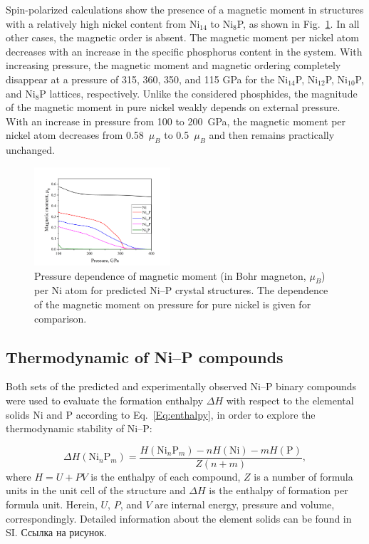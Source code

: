 \documentclass[twoside,twocolumn,9pt]{article}
\begin{document}
Spin-polarized calculations show the presence of a magnetic moment in structures with a relatively high nickel content from Ni$_{14}$ to Ni$_8$P, as shown in Fig.~\ref{fgr:magmom}. 
In all other cases, the magnetic order is absent. The magnetic moment per nickel atom decreases with an increase in the specific phosphorus content in the system. 
With increasing pressure, the magnetic moment and magnetic ordering completely disappear at a pressure of 315, 360, 350, and 115 GPa for the Ni$_{14}$P, Ni$_{12}$P, Ni$_{10}$P, and Ni$_8$P lattices, respectively. 
Unlike the considered phosphides, the magnitude of the magnetic moment in pure nickel weakly depends on external pressure. 
With an increase in pressure from 100 to 200~GPa, the magnetic moment per nickel atom decreases from 0.58~$\mu_B$ to 0.5~$\mu_B$ and then remains practically unchanged.

\begin{figure}[h]
\centering
  \includegraphics[width=0.45\textwidth]{magmom-uspex.jpg}
  \caption{Pressure dependence of magnetic moment (in Bohr magneton, $\mu_B$) per Ni atom for predicted Ni--P crystal structures.
  The dependence of the magnetic moment on pressure for pure nickel is given for comparison.
  }
  \label{fgr:magmom}
\end{figure}



\subsection{Thermodynamic of Ni--P compounds}

Both sets of the predicted and experimentally observed Ni--P binary compounds were used to evaluate the formation enthalpy $\Delta H$ with respect to the elemental solids Ni and P according to Eq.~\ref{Eq:enthalpy}, in order to explore the thermodynamic stability of Ni--P:  

\begin{equation}\label{Eq:enthalpy}
 \Delta H(\mathrm{Ni}_n\mathrm{P}_m) = \frac{H(\mathrm{Ni}_n\mathrm{P}_m)-nH(\mathrm{Ni})-mH(\mathrm{P})}{Z(n+m)},
\end{equation} 
where $H=U+PV$ is the enthalpy of each compound, $Z$ is a number of formula units in the unit cell of the structure and $\Delta H$ is the enthalpy of formation per formula unit. 
Herein, $U$, $P$, and $V$ are internal energy, pressure and volume, correspondingly. 
Detailed information about the element solids can be found in SI. Ссылка на рисунок.
\end{document}
